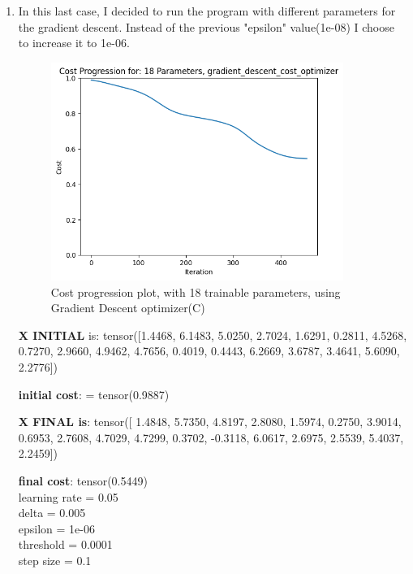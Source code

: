\documentclass[inscr,ack,preface]{diphdthesis}
\begin{document}
\begin{enumerate}[label=\textbf{\Alph*.}]
\item \textbf{ }
In this last case, I decided to run the program with different parameters for the gradient descent. Instead of the previous "epsilon" value(1e-08) I choose to increase it to 1e-06.
\begin{figure}[H]
\begin{center}
    \includegraphics[width=0.9\textwidth]{epsilon06/18.png}
    \caption{Cost progression plot, with 18 trainable parameters, using Gradient Descent optimizer(C)} 
    \label{fig:enter-label}
    \end{center}
\end{figure}

\textbf{X INITIAL} is:
 tensor([1.4468, 6.1483, 5.0250, 2.7024, 1.6291, 0.2811, 4.5268, 0.7270, 2.9660,
        4.9462, 4.7656, 0.4019, 0.4443, 6.2669, 3.6787, 3.4641, 5.6090, 2.2776])
        
\textbf{initial cost}: = tensor(0.9887)

\textbf{X FINAL is}:
tensor([ 1.4848,  5.7350,  4.8197,  2.8080,  1.5974,  0.2750,  3.9014,  0.6953,
         2.7608,  4.7029,  4.7299,  0.3702, -0.3118,  6.0617,  2.6975,  2.5539,
         5.4037,  2.2459])

\textbf{final cost}: tensor(0.5449)\\

learning rate =  0.05 \\
delta =  0.005 \\
epsilon =  1e-06 \\
threshold =  0.0001\\
step size =  0.1 \\

\end{enumerate}
\end{document}
